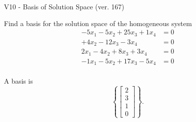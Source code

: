 \begin{exercise}
  \begin{exerciseTitle}V10 - Basis of Solution Space (ver. 167)\end{exerciseTitle}
  \begin{exerciseStatement}
    Find a basis for the solution space of the homogeneous system 
\begin{align*}
 -5 x_ 1 -5 x_ 2 + 25 x_ 3 + 1 x_ 4 &= 0  \\ 
  + 4 x_ 2 -12 x_ 3 -3 x_ 4 &= 0  \\ 
  2 x_ 1 -4 x_ 2 + 8 x_ 3 + 3 x_ 4 &= 0  \\ 
  -1 x_ 1 -5 x_ 2 + 17 x_ 3 -5 x_ 4 &= 0  \\ 
 \end{align*}


 
  \end{exerciseStatement}

  \begin{exerciseAnswer}
   A basis is   
\[\left\{\left[\begin{array}{c}
2 \\
3 \\
1 \\
0
\end{array}\right]\right\}.\]

  


  \end{exerciseAnswer}
\end{exercise}
